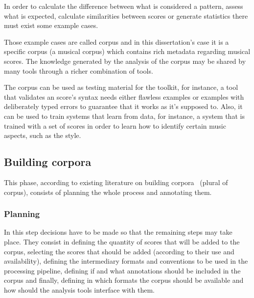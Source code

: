 In order to calculate the difference between what is considered a pattern, assess what is expected,
calculate similarities between scores or generate statistics there must exist some example cases.

Those example cases are called corpus and in this dissertation's case it is a specific corpus (a
musical corpus) which contains rich metadata regarding musical scores. The knowledge generated by
the analysis of the corpus may be shared by many tools through a richer combination of tools.

The corpus can be used as testing material for the toolkit, for instance, a tool that validates an
\abc{} score's syntax needs either flawless examples or examples with deliberately typed errors to
guarantee that it works as it's supposed to. Also, it can be used to train systems that learn from
data, for instance, a system that is trained with a set of scores in order to learn how to identify
certain music aspects, such as the style.


\subsection{Building corpora}

This phase, according to existing literature on building corpora~\cite{Atkins1992,
wynne2005developing,teseandre} (plural of corpus), consists of planning the whole process and
annotating them.

\subsubsection*{Planning}

In this step decisions have to be made so that the remaining steps may take place. They consist in
defining the quantity of scores that will be added to the corpus, selecting the scores that should
be added (according to their use and availability), defining the intermediary formats and
conventions to be used in the processing pipeline, defining if and what annotations should be
included in the corpus and finally, defining in which formats the corpus should be available and how
should the analysis tools interface with them.

